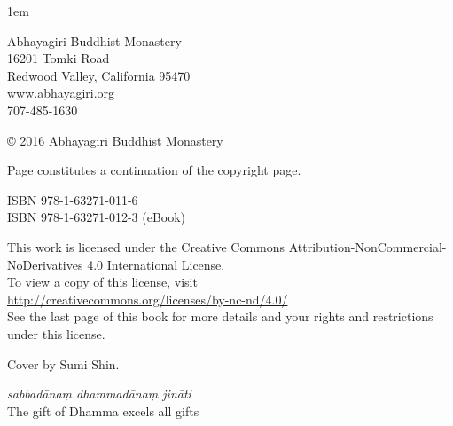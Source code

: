 \thispagestyle{empty}
{\raggedright\small
\parindent 0pt
\parskip 1em

Abhayagiri Buddhist Monastery\\
16201 Tomki Road\\
Redwood Valley, California 95470\\
\href{http://www.abhayagiri.org}{www.abhayagiri.org}\\
707-485-1630

© 2016 Abhayagiri Buddhist Monastery

Page \pageref{credits} constitutes a continuation of the copyright page.

ISBN 978-1-63271-011-6\\
ISBN 978-1-63271-012-3 (eBook)

This work is licensed under the Creative Commons
Attribution-NonCommercial-NoDerivatives 4.0 International License.\\
To view a copy of this license, visit\\
\href{http://creativecommons.org/licenses/by-nc-nd/4.0}
{http://creativecommons.org/licenses/by-nc-nd/4.0/}\\[.5em]
See the last page of this book for more details and
your rights and restrictions under this license.

Cover by Sumi Shin.

\emph{sabbadānaṃ dhammadānaṃ jināti}\\
The gift of Dhamma excels all gifts

}
\clearpage
